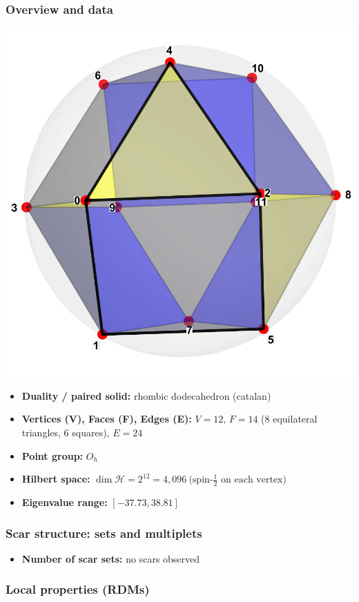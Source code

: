 \documentclass[11pt,a4paper]{article}
\begin{document}
\subsubsection*{Overview and data}
\begin{center}
  \includegraphics[width=.6\linewidth]{cuboctahedron}
\end{center}

\begin{itemize}[leftmargin=1.5em]
  \item \textbf{Duality / paired solid:} rhombic dodecahedron (catalan)
  \item \textbf{Vertices (V), Faces (F), Edges (E):} $V = 12$,\; $F = 14$ (8 equilateral triangles, 6 squares),\; $E = 24$
  \item \textbf{Point group:} $O_h$
  \item \textbf{Hilbert space:} \(
        \dim\mathcal{H} = 2^{12} = 4,096\ \text{(spin-$\tfrac12$ on each vertex)}
        \)
  \item \textbf{Eigenvalue range:} $[-37.73, 38.81]$
\end{itemize}

\subsubsection*{Scar structure: sets and multiplets}

\begin{itemize}[leftmargin=1.5em]
  \item \textbf{Number of scar sets:} no scars observed
  \end{itemize}

\subsubsection*{Local properties (RDMs)}
\end{document}
